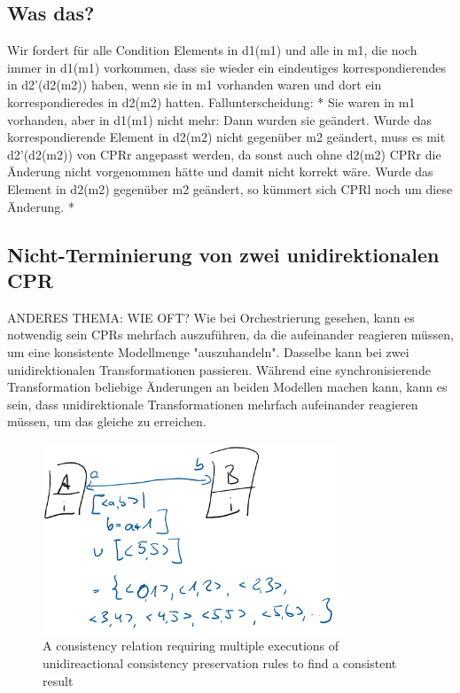 \subsection{Was das?}
Wir fordert für alle Condition Elements in d1(m1) und alle in m1, die noch immer in d1(m1) vorkommen, dass sie wieder ein eindeutiges korrespondierendes in d2'(d2(m2)) haben, wenn sie in m1 vorhanden waren und dort ein korrespondieredes in d2(m2) hatten.
Fallunterscheidung:
* Sie waren in m1 vorhanden, aber in d1(m1) nicht mehr: Dann wurden sie geändert. Wurde das korrespondierende Element in d2(m2) nicht gegenüber m2 geändert, muss es mit d2'(d2(m2)) von CPRr angepasst werden, da sonst auch ohne d2(m2) CPRr die Änderung nicht vorgenommen hätte und damit nicht korrekt wäre. Wurde das Element in d2(m2) gegenüber m2 geändert, so kümmert sich CPRl noch um diese Änderung. 
* 



\subsection{Nicht-Terminierung von zwei unidirektionalen CPR}

ANDERES THEMA: WIE OFT?
Wie bei Orchestrierung gesehen, kann es notwendig sein CPRs mehrfach auszuführen, da die aufeinander reagieren müssen, um eine konsistente Modellmenge "auszuhandeln".
Dasselbe kann bei zwei unidirektionalen Transformationen passieren. Während eine synchronisierende Transformation beliebige Änderungen an beiden Modellen machen kann, kann es sein, dass unidirektionale Transformationen mehrfach aufeinander reagieren müssen, um das gleiche zu erreichen.

\begin{figure}
    \centering
    \includegraphics[width=0.8\textwidth]{figures/correctness/synchronization/multiple_unidirectional_execution.png}
    \caption[Multiple execution of unidirectional consistency preservation rules]{A consistency relation requiring multiple executions of unidireactional consistency preservation rules to find a consistent result}
    \label{fig:synchronization:multiple_unidirectional_execution}
\end{figure}

